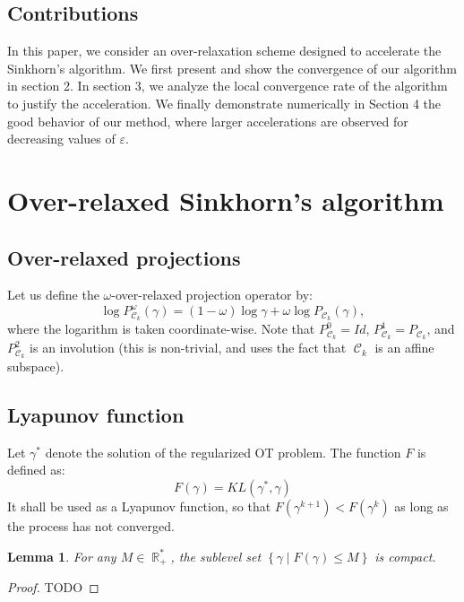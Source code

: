 \documentclass{article} %
\DeclareMathOperator{\IR}{\mathbb{R}}
\DeclareMathOperator{\Ccal}{\mathcal{C}}
\renewcommand{\epsilon}{\varepsilon}
\theoremstyle{plain}
\newtheorem{lemma}{Lemma}
\theoremstyle{definition}
\theoremstyle{remark}
\begin{document}
\subsection{Contributions}
In this paper, we consider an over-relaxation scheme  designed to accelerate  the Sinkhorn's algorithm. We first present and show the convergence of our algorithm in section 2. In section 3, we analyze the local convergence rate of the algorithm to justify the acceleration.
We finally demonstrate numerically  in Section 4 the good behavior of our method, where larger accelerations are observed for decreasing values of $\epsilon$.



\section{Over-relaxed Sinkhorn's algorithm}

\subsection{Over-relaxed projections}

Let us define the $\omega$-over-relaxed projection operator by:
\begin{equation}\label{eq:def_or_proj}
\log P^\omega_{\Ccal_k}(\gamma) = (1-\omega) \log \gamma + \omega \log P_{\Ccal_k}(\gamma),
\end{equation}
where the logarithm is taken coordinate-wise.
Note that $P_{\Ccal_k}^0 = Id$, $P_{\Ccal_k}^1 = P_{\Ccal_k}$, and $P_{\Ccal_k}^2$ is an involution (this is non-trivial, and uses the fact that $\Ccal_k$ is an affine subspace).

\subsection{Lyapunov function}
Let $\gamma^*$ denote the solution of the regularized OT problem.
The function $F$ is defined as:
\begin{equation}\label{eq:lyapunov_function}
F(\gamma) = KL(\gamma^*, \gamma)
\end{equation}
It shall be used as a Lyapunov function, so that $F(\gamma^{k+1}) < F(\gamma^k)$ as long as the process has not converged.


\begin{lemma} \label{lemma:KL_compact}
	For any $M \in \IR_+^*$, the sublevel set $\left\{ \gamma \mid F(\gamma) \le M \right\}$ is compact.
\end{lemma}
\begin{proof}
	{\color{red} TODO}
\end{proof}
\end{document}
